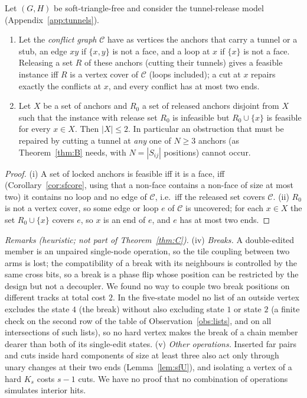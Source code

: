 \begin{theorem}\label{thm:C}
Let $(G,H)$ be soft-triangle-free and consider the tunnel-release model (Appendix~\ref{app:tunnels}).
\begin{enumerate}
\item[(i)] Let the \emph{conflict graph} $\mathcal C$ have as vertices the anchors that carry a tunnel or a stub, an edge $xy$ if $\{x,y\}$ is not a face, and a loop at $x$ if $\{x\}$ is not a face. Releasing a set $R$ of these anchors (cutting their tunnels) gives a feasible instance iff $R$ is a vertex cover of $\mathcal C$ (loops included); a cut at $x$ repairs exactly the conflicts at $x$, and every conflict has at most two ends.
\item[(ii)] Let $X$ be a set of anchors and $R_0$ a set of released anchors disjoint from $X$ such that the instance with release set $R_0$ is infeasible but $R_0\cup\{x\}$ is feasible for every $x\in X$. Then $|X|\le2$. In particular an obstruction that must be repaired by cutting a tunnel at \emph{any} one of $N\ge3$ anchors (as Theorem~\ref{thm:B} needs, with $N=|S_{ij}|$ positions) cannot occur.
\end{enumerate}
\end{theorem}
\begin{proof}
(i) A set of locked anchors is feasible iff it is a face, iff (Corollary~\ref{cor:sfcore}, using that a non-face contains a non-face of size at most two) it contains no loop and no edge of $\mathcal C$, i.e.\ iff the released set covers $\mathcal C$. (ii) $R_0$ is not a vertex cover, so some edge or loop $e$ of $\mathcal C$ is uncovered; for each $x\in X$ the set $R_0\cup\{x\}$ covers $e$, so $x$ is an end of $e$, and $e$ has at most two ends.
\end{proof}
\emph{Remarks (heuristic; not part of Theorem~\ref{thm:C}).} (iv) \emph{Breaks.} A double-edited member is an unpaired single-node operation, so the tile coupling between two arms is lost; the compatibility of a break with its neighbours is controlled by the same cross bits, so a break is a phase flip whose position can be restricted by the design but not a decoupler. We found no way to couple two break positions on different tracks at total cost $2$. In the five-state model no list of an outside vertex excludes the state $4$ (the break) without also excluding state $1$ or state $2$ (a finite check on the second row of the table of Observation~\ref{obs:lists}, and on all intersections of such lists), so no hard vertex makes the break of a chain member dearer than both of its single-edit states. (v) \emph{Other operations.} Inserted far pairs and cuts inside hard components of size at least three also act only through unary changes at their two ends (Lemma~\ref{lem:sfU}), and isolating a vertex of a hard $K_s$ costs $s-1$ cuts. We have no proof that no combination of operations simulates interior hits.

